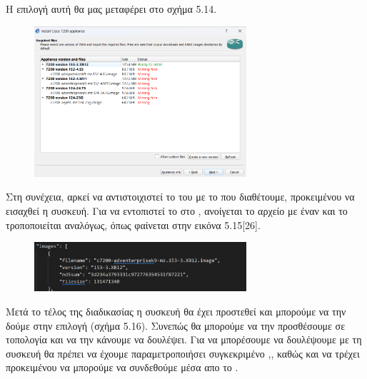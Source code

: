 \FloatBarrier

\noindent Η επιλογή αυτή θα μας μεταφέρει στο σχήμα 5.14.

\begin{figure}[htb]
	\centering
	\includegraphics[width=0.7\textwidth]{graphics/appliances.png}
	\caption{ }
\end{figure}

\FloatBarrier

\noindent Στη συνέχεια, αρκεί να αντιστοιχιστεί το  του  με το  που διαθέτουμε, προκειμένου να εισαχθεί η συσκευή. Για να εντοπιστεί το  στο , ανοίγεται το αρχείο με έναν  και το  τροποποιείται αναλόγως, όπως φαίνεται στην εικόνα 5.15[26].

\FloatBarrier

\begin{figure}[htb]
	\centering
	\includegraphics[width=0.7\textwidth]{graphics/appliance_filename.png}
	\caption{ }
\end{figure}

\FloatBarrier

Μετά το τέλος της διαδικασίας η συσκευή θα έχει προστεθεί και μπορούμε να την δούμε στην επιλογή (σχήμα 5.16).
Συνεπώς θα μπορούμε να την προσθέσουμε σε τοπολογία και να την κάνουμε να δουλέψει. Για να μπορέσουμε να δουλέψουμε με τη συσκευή θα πρέπει να έχουμε παραμετροποιήσει συγκεκριμένο ,, καθώς και να τρέχει 
προκειμένου να μπορούμε να συνδεθούμε μέσα απο το . 

